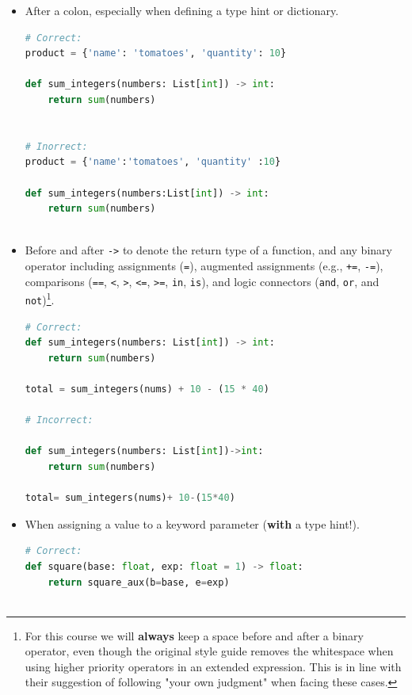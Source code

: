 \documentclass{tufte-handout}
\begin{document}
\begin{itemize}
	\item After a colon, especially when defining a type hint or dictionary.
	
\begin{lstlisting}[numbers=none,language=python]
# Correct:
product = {'name': 'tomatoes', 'quantity': 10}

def sum_integers(numbers: List[int]) -> int:
	return sum(numbers)
	
	
# Inorrect:
product = {'name':'tomatoes', 'quantity' :10}

def sum_integers(numbers:List[int]) -> int:
    return sum(numbers)
	
\end{lstlisting}
	
	\item Before and after \texttt{->} to denote the return type of a function, and any binary operator including assignments (\texttt{=}), augmented assignments (e.g., \texttt{+=}, \texttt{-=}), comparisons (\texttt{==}, \texttt{<}, \texttt{>}, \texttt{<=}, \texttt{>=}, \texttt{in}, \texttt{is}), and logic connectors (\texttt{and}, \texttt{or}, and \texttt{not})\footnote{For this course we will \textbf{always} keep a space before and after a binary operator, even though the original style guide removes the whitespace when using higher priority operators in an extended expression. This is in line with their suggestion of following "your own judgment" when facing these cases.}.

\begin{lstlisting}[numbers=none,language=python]
# Correct:
def sum_integers(numbers: List[int]) -> int:
    return sum(numbers)

total = sum_integers(nums) + 10 - (15 * 40)

# Incorrect:

def sum_integers(numbers: List[int])->int:
    return sum(numbers)
    
total= sum_integers(nums)+ 10-(15*40)

\end{lstlisting}
	
	\item When assigning a value to a keyword parameter (\textbf{with} a type hint!).
	
\begin{lstlisting}[numbers=none,language=python]
# Correct:
def square(base: float, exp: float = 1) -> float:
    return square_aux(b=base, e=exp)
			

\end{lstlisting}
\end{itemize}
\end{document}
